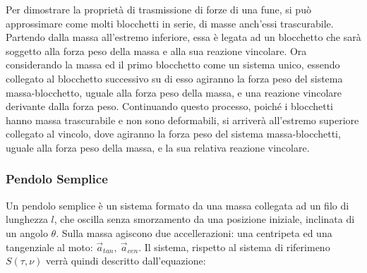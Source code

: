 \documentclass{article}
\numberwithin{equation}{subsection}
\begin{document}
\begin{center}\end{center}

Per dimostrare la proprietà di trasmissione di forze di una fune, si può approssimare 
come molti blocchetti in serie, di masse anch'essi trascurabile. 
Partendo dalla massa all'estremo inferiore, essa è legata ad un 
blocchetto che sarà soggetto alla forza peso della massa e alla 
sua reazione vincolare. Ora considerando la massa ed il primo 
blocchetto come un sistema unico, essendo collegato al blocchetto 
successivo su di esso agiranno la forza peso del sistema massa-blocchetto, uguale alla forza peso della massa, e una reazione 
vincolare derivante dalla forza peso. Continuando questo processo, 
poiché i blocchetti hanno massa trascurabile e non sono deformabili, 
si arriverà all'estremo superiore collegato al vincolo, dove agiranno 
la forza peso del sistema massa-blocchetti, uguale alla forza peso 
della massa, e la sua relativa reazione vincolare.

\subsubsection{Pendolo Semplice}
Un pendolo semplice è un sistema formato da una massa collegata 
ad un filo di lunghezza $l$, che oscilla senza smorzamento da una posizione iniziale, inclinata 
di un angolo $\theta$. Sulla massa agiscono due accellerazioni: 
una centripeta ed una tangenziale al moto: $\vec{a}_{tan},\:\vec{a}_{cen}$. 
Il sistema, rispetto al sistema di riferimeno $S(\tau,\nu)$ 
verrà quindi descritto dall'equazione:
\end{document}
